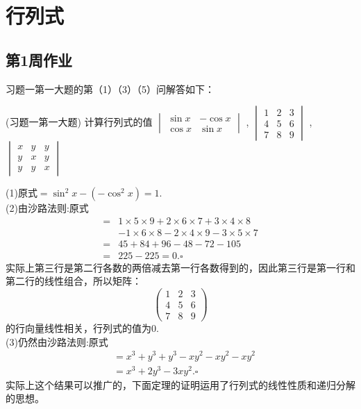 \chapter{行列式}
\section{第1周作业}
习题一第一大题的第（1）（3）（5）问解答如下：
\begin{example}{(习题一第一大题)}{}
计算行列式的值
$\begin{vmatrix}
    \sin x & -\cos x \\
    \cos x & \sin x
\end{vmatrix}$
,
$\begin{vmatrix}
    1 & 2 & 3 \\
    4 & 5 & 6 \\
    7 & 8 & 9
\end{vmatrix}$
,
$\begin{vmatrix}
    x & y & y \\
    y & x & y \\
    y & y & x
\end{vmatrix}$
\end{example}
\begin{solution}{}{}
    (1)原式$=\sin^2x-(-\cos^2x)=1$.\\
    (2)由沙路法则:原式\vspace{-10pt}\\
    \vspace{-10pt}
    \begin{align*}
        =&1\times5\times9+2\times6\times7+3\times4\times8\\
        &-1\times6\times8-2\times4\times9-3\times5\times7\\
        =&45+84+96-48-72-105\\
        =&225-225=0.\square
    \end{align*}
    实际上第三行是第二行各数的两倍减去第一行各数得到的，因此第三行是第一行和第二行的线性组合，所以矩阵：
    \[
    \begin{pmatrix} 
        1 & 2 & 3 \\
        4 & 5 & 6 \\
        7 & 8 & 9
    \end{pmatrix}
    \]的行向量线性相关，行列式的值为0.\\
    (3)仍然由沙路法则:原式\vspace{=-10pt}
    \begin{align*}
        &=x^3+y^3+y^3-xy^2-xy^2-xy^2\\
        &=x^3+2y^3-3xy^2.\square
    \end{align*}
    实际上这个结果可以推广的，下面定理的证明运用了​​行列式的线性性质​​和​​递归分解​​的思想。
\end{solution}
